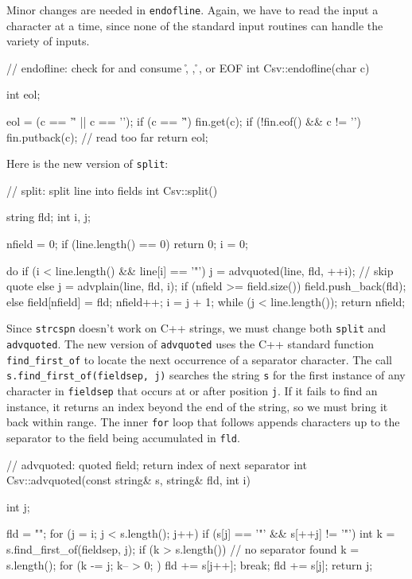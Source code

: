 Minor changes are needed in \verb'endofline'. Again, we have to read the
input a character at a time, since none of the standard input routines can
handle the variety of inputs.
\begin{wellcode}
    // endofline: check for and consume \r, \n, \r\n, or EOF
    int Csv::endofline(char c)
    {
        int eol;

        eol = (c == '\r' || c == '\n');
        if (c == '\r') {
            fin.get(c);
            if (!fin.eof() && c != '\n')
                fin.putback(c); // read too far
        }
        return eol;
    }
\end{wellcode}
Here is the new version of \verb'split':
\begin{wellcode}
    // split: split line into fields
    int Csv::split()
    {
        string  fld;
        int     i, j;

        nfield = 0;
        if (line.length() == 0)
            return 0;
        i = 0;

        do {
            if (i < line.length() && line[i] == '"')
                j = advquoted(line, fld, ++i);  // skip quote
            else
                j = advplain(line, fld, i);
            if (nfield >= field.size())
                field.push_back(fld);
            else
                field[nfield] = fld;
            nfield++;
            i = j + 1;
        } while (j < line.length());
        return nfield;
    }
\end{wellcode}

Since \verb'strcspn' doesn't work on C++ strings, we must change both
\verb'split' and \verb'advquoted'. The new version of \verb'advquoted' uses
the C++ standard function \verb'find_first_of' to locate the next
occurrence of a separator character. The call
\verb's.find_first_of(fieldsep, j)' searches the string \verb's' for the
first instance of any character in \verb'fieldsep' that occurs at or after
position \verb'j'. If it fails to find an instance, it returns an index
beyond the end of the string, so we must bring it back within range.  The
inner \verb'for' loop that follows appends characters up to the separator
to the field being accumulated in \verb'fld'.
\begin{wellcode}
    // advquoted: quoted field; return index of next separator
    int Csv::advquoted(const string& s, string& fld, int i)
    {
        int j;

        fld = "";
        for (j = i; j < s.length(); j++) {
            if (s[j] == '"' && s[++j] != '"') {
                int k = s.find_first_of(fieldsep, j);
                if (k > s.length()) // no separator found
                    k = s.length();
                for (k -= j; k-- > 0; )
                    fld += s[j++];
                break;
            }
            fld += s[j];
        }
        return j;
    }
\end{wellcode}

